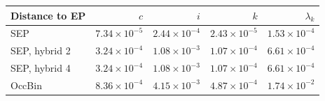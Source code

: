 \begin{tabular}{lrrrr}
\toprule
Distance to EP & $c$ & $i$ & $k$ & $\lambda_k$ \\
\midrule
SEP & $7.34\times10^{-5}$ & $2.44\times10^{-4}$ & $2.43\times10^{-5}$ & $1.53\times10^{-4}$ \\
SEP, hybrid 2 & $3.24\times10^{-4}$ & $1.08\times10^{-3}$ & $1.07\times10^{-4}$ & $6.61\times10^{-4}$ \\
SEP, hybrid 4 & $3.24\times10^{-4}$ & $1.08\times10^{-3}$ & $1.07\times10^{-4}$ & $6.61\times10^{-4}$ \\
OccBin & $8.36\times10^{-4}$ & $4.15\times10^{-3}$ & $4.87\times10^{-4}$ & $1.74\times10^{-2}$ \\
\bottomrule
\end{tabular}
